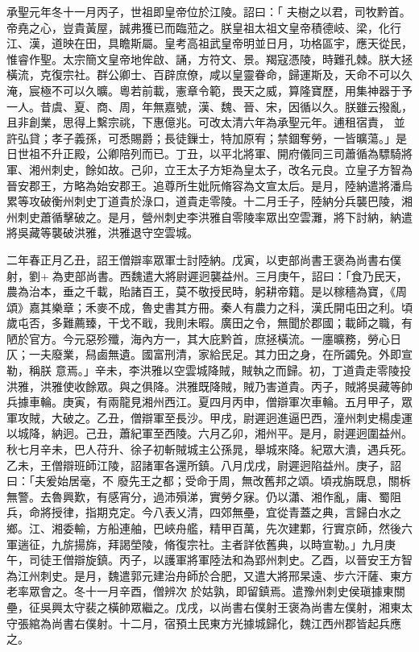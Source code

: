\begin{pinyinscope}
 承聖元年冬十一月丙子，世祖即皇帝位於江陵。詔曰：「
 夫樹之以君，司牧黔首。帝堯之心，豈貴黃屋，誠弗獲已而臨蒞之。朕皇祖太祖文皇帝積德岐、梁，化行江、漢，道映在田，具瞻斯屬。皇考高祖武皇帝明並日月，功格區宇，應天從民，惟睿作聖。太宗簡文皇帝地侔啟、誦，方符文、景。羯寇憑陵，時難孔棘。朕大拯橫流，克復宗社。群公卿士、百辟庶僚，咸以皇靈眷命，歸運斯及，天命不可以久淹，宸極不可以久曠。粵若前載，憲章令範，畏天之威，算隆寶歷，用集神器于予一人。昔虞、夏、商、周，年無嘉號，漢、魏、晉、宋，因循以久。朕雖云撥亂，且非創業，思得上繫宗祧，下惠億兆。可改太清六年為承聖元年。逋租宿責，
 並許弘貸；孝子義孫，可悉賜爵；長徒鏁士，特加原宥；禁錮奪勞，一皆曠蕩。」是日世祖不升正殿，公卿陪列而已。丁丑，以平北將軍、開府儀同三司蕭循為驃騎將軍、湘州刺史，餘如故。己卯，立王太子方矩為皇太子，改名元良。立皇子方智為晉安郡王，方略為始安郡王。追尊所生妣阮脩容為文宣太后。是月，陸納遣將潘烏累等攻破衡州刺史丁道貴於淥口，道貴走零陵。十二月壬子，陸納分兵襲巴陵，湘州刺史蕭循擊破之。是月，營州刺史李洪雅自零陵率眾出空雲灘，將下討納，納遣將吳藏等襲破洪雅，洪雅退守空雲城。



 二年春正月乙丑，詔王僧辯率眾軍士討陸納。戊寅，以吏部尚書王褒為尚書右僕射，劉+為吏部尚書。西魏遣大將尉遲迥襲益州。三月庚午，詔曰：「食乃民天，農為治本，垂之千載，貽諸百王，莫不敬授民時，躬耕帝籍。是以稼穡為寶，《周頌》嘉其樂章；禾麥不成，魯史書其方冊。秦人有農力之科，漢氏開屯田之利。頃歲屯否，多難薦臻，干戈不戢，我則未暇。廣田之令，無聞於郡國；載師之職，有陋於官方。今元惡殄殲，海內方一，其大庇黔首，庶拯橫流。一廛曠務，勞心日仄；一夫廢業，舄鹵無遺。國富刑清，家給民足。其力田之身，在所蠲免。外即宣勒，稱朕
 意焉。」辛未，李洪雅以空雲城降賊，賊執之而歸。初，丁道貴走零陵投洪雅，洪雅使收餘眾。與之俱降。洪雅既降賊，賊乃害道貴。丙子，賊將吳藏等帥兵據車輪。庚寅，有兩龍見湘州西江。夏四月丙申，僧辯軍次車輪。五月甲子，眾軍攻賊，大破之。乙丑，僧辯軍至長沙。甲戌，尉遲迥進逼巴西，潼州刺史楊虔運以城降，納迥。己丑，蕭紀軍至西陵。六月乙卯，湘州平。是月，尉遲迥圍益州。秋七月辛未，巴人苻升、徐子初斬賊城主公孫晁，舉城來降。紀眾大潰，遇兵死。乙未，王僧辯班師江陵，詔諸軍各還所鎮。八月戊戌，尉遲迥陷益州。庚子，詔曰：「夫爰始居毫，不
 廢先王之都；受命于周，無改舊邦之頌。頃戎旃既息，關柝無警。去魯興歎，有感宵分，過沛殞涕，實勞夕寐。仍以瀟、湘作亂，庸、蜀阻兵，命將授律，指期克定。今八表乂清，四郊無壘，宜從青蓋之典，言歸白水之鄉。江、湘委輸，方船連舳，巴峽舟艦，精甲百萬，先次建鄴，行實京師，然後六軍遄征，九旂揚旆，拜謁塋陵，脩復宗社。主者詳依舊典，以時宣勒。」九月庚午，司徒王僧辯旋鎮。丙子，以護軍將軍陸法和為郢州刺史。乙酉，以晉安王方智為江州刺史。是月，魏遣郭元建治舟師於合肥，又遣大將邢杲遠、步六汗薩、東方老率眾會之。冬十一月辛酉，僧辨次
 於姑孰，即留鎮焉。遣豫州刺史侯瑱據東關壘，征吳興太守裴之橫帥眾繼之。戊戌，以尚書右僕射王褒為尚書左僕射，湘東太守張綰為尚書右僕射。十二月，宿預土民東方光據城歸化，魏江西州郡皆起兵應之。




\end{pinyinscope}
